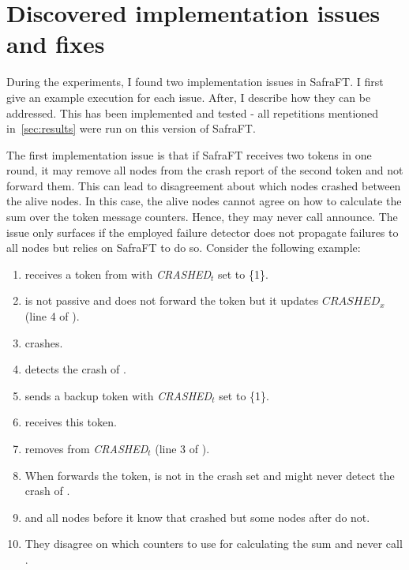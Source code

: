 \section{Discovered implementation issues and fixes}
\label{sec:safraBugs}

During the experiments, I found two implementation issues in SafraFT.
I first give an example execution for each issue.
After, I describe how they can be addressed.
This has been implemented and tested - all repetitions mentioned in~\cref{sec:results} were run on this version of SafraFT.

The first implementation issue is that if SafraFT receives two tokens in one round, it may remove all nodes from the crash report of the second token and not forward them.
This can lead to disagreement about which nodes crashed between the alive nodes.
In this case, the alive nodes cannot agree on how to calculate the sum over the token message counters.
Hence, they may never call announce.
The issue only surfaces if the employed failure detector does not propagate failures to all nodes but relies on SafraFT to do so.
Consider the following example:

\begin{enumerate}
	\item {} receives a token from  with \textit{CRASHED}$_t$ set to \{1\}.
	\item {} is not passive and does not forward the token but it updates $CRASHED_x$ (line 4 of ).
	\item {} crashes.
	\item {} detects the crash of .
	\item {} sends a backup token with \textit{CRASHED}$_t$ set to \{1\}.
	\item {} receives this token.
	\item {} removes  from \textit{CRASHED}$_t$ (line 3 of ).
	\item When  forwards the token,  is not in the crash set and  might never detect the crash of .
	\item {} and all nodes before it know that  crashed but some nodes after  do not.
	\item They disagree on which counters to use for calculating the sum and never call .
\end{enumerate}


